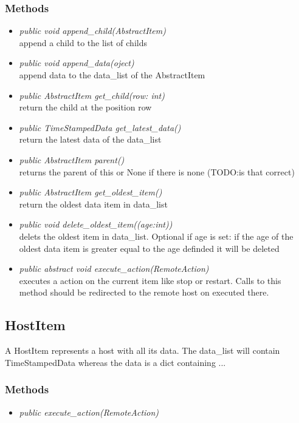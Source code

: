 \subsubsection{Methods}
\begin{itemize}
   \item \textit{public void append\_child(AbstractItem)}\\ 
   append a child to the list of childs
  \item \textit{public void append\_data(oject)}\\ 
  append data to the data\_list of the AbstractItem
  \item \textit{public AbstractItem get\_child(row: int)}\\ 
  return the child at the position row
  \item \textit{public TimeStampedData get\_latest\_data()}\\ 
  return the latest data of the data\_list
  \item \textit{public AbstractItem parent()}\\ 
  returns the parent of this or None if there is none (TODO:is that correct)
  \item \textit{public AbstractItem get\_oldest\_item()}\\ 
  return the oldest data item in data\_list
  \item \textit{public void delete\_oldest\_item((age:int))}\\ 
  delets the oldest item in data\_list. Optional if age is set: if the age of the oldest data item is greater equal to the age definded it will be deleted
  \item \textit{public abstract void execute\_action(RemoteAction)}\\ 
  executes a action on the current item like stop or restart. Calls to this
  method should be redirected to the remote host on executed there.
\end{itemize}

\subsection{HostItem}
A HostItem represents a host with all its data.
The data\_list will contain TimeStampedData whereas the data is a dict containing ...
\subsubsection{Methods}
\begin{itemize}
  \item \textit{public execute\_action(RemoteAction)}\\
  
\end{itemize}


